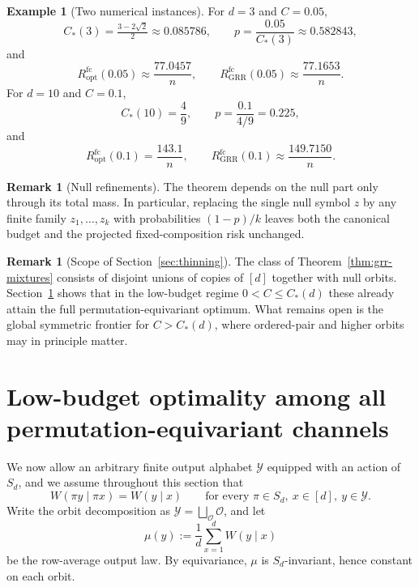 \documentclass[11pt]{amsart}
\numberwithin{equation}{section}
\theoremstyle{definition}
\newtheorem{remark}[theorem]{Remark}
\newtheorem{example}[theorem]{Example}
\begin{document}
\begin{example}[Two numerical instances]\label{ex:aug-grr-numbers}
For \(d=3\) and \(C=0.05\),
\[
C_\ast(3)=\tfrac{3-2\sqrt2}{2}\approx 0.085786,
\qquad
p=\frac{0.05}{C_\ast(3)}\approx 0.582843,
\]
and
\[
R^{\mathrm{fc}}_{\mathrm{opt}}(0.05)\approx \frac{77.0457}{n},
\qquad
R^{\mathrm{fc}}_{\mathrm{GRR}}(0.05)\approx \frac{77.1653}{n}.
\]
For \(d=10\) and \(C=0.1\),
\[
C_\ast(10)=\frac49,
\qquad
p=\frac{0.1}{4/9}=0.225,
\]
and
\[
R^{\mathrm{fc}}_{\mathrm{opt}}(0.1)=\frac{143.1}{n},
\qquad
R^{\mathrm{fc}}_{\mathrm{GRR}}(0.1)\approx \frac{149.7150}{n}.
\]
\end{example}

\begin{remark}[Null refinements]\label{rem:null-refinement}
The theorem depends on the null part only through its total mass.
In particular, replacing the single null symbol \(z\) by any finite family
\(z_1,\dots,z_k\) with probabilities \((1-p)/k\) leaves both the canonical budget and the
projected fixed-composition risk unchanged.
\end{remark}

\begin{remark}[Scope of Section~\ref{sec:thinning}]\label{rem:not-all-equivariant}
The class of Theorem~\ref{thm:grr-mixtures} consists of disjoint unions of copies of \([d]\)
together with null orbits.
Section~\ref{sec:equivariant-opt} shows that in the low-budget regime \(0<C\le C_\ast(d)\)
these already attain the full permutation-equivariant optimum.
What remains open is the global symmetric frontier for \(C>C_\ast(d)\), where ordered-pair
and higher orbits may in principle matter.
\end{remark}

\section{Low-budget optimality among all permutation-equivariant channels}\label{sec:equivariant-opt}

We now allow an arbitrary finite output alphabet \(\mathcal Y\) equipped with an action of \(S_d\),
and we assume throughout this section that
\[
W(\pi y\mid \pi x)=W(y\mid x)
\qquad
\text{for every } \pi\in S_d,\ x\in[d],\ y\in\mathcal Y.
\]
Write the orbit decomposition as
\(
\mathcal Y=\bigsqcup_{\mathcal O}\mathcal O
\),
and let
\[
\mu(y):=\frac1d\sum_{x=1}^d W(y\mid x)
\]
be the row-average output law.
By equivariance, \(\mu\) is \(S_d\)-invariant, hence constant on each orbit.
\end{document}
